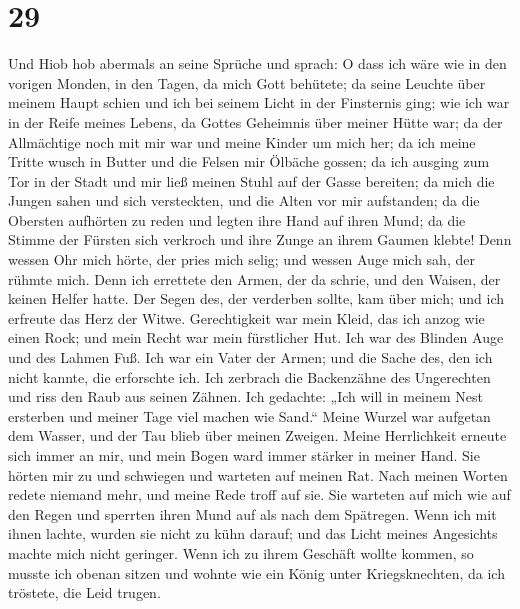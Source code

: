 \hypertarget{section-28}{%
\section{29}\label{section-28}}

 Und Hiob hob abermals an seine Sprüche und sprach:
 O dass ich wäre wie in den vorigen Monden, in den Tagen,
da mich Gott behütete;  da seine Leuchte über meinem Haupt
schien und ich bei seinem Licht in der Finsternis ging; 
wie ich war in der Reife meines Lebens, da Gottes Geheimnis über meiner
Hütte war;  da der Allmächtige noch mit mir war und meine
Kinder um mich her;  da ich meine Tritte wusch in Butter
und die Felsen mir Ölbäche gossen;  da ich ausging zum Tor
in der Stadt und mir ließ meinen Stuhl auf der Gasse bereiten;
 da mich die Jungen sahen und sich versteckten, und die
Alten vor mir aufstanden;  da die Obersten aufhörten zu
reden und legten ihre Hand auf ihren Mund;  da die Stimme
der Fürsten sich verkroch und ihre Zunge an ihrem Gaumen klebte!
 Denn wessen Ohr mich hörte, der pries mich selig; und
wessen Auge mich sah, der rühmte mich.  Denn ich
errettete den Armen, der da schrie, und den Waisen, der keinen Helfer
hatte.  Der Segen des, der verderben sollte, kam über
mich; und ich erfreute das Herz der Witwe.  Gerechtigkeit
war mein Kleid, das ich anzog wie einen Rock; und mein Recht war mein
fürstlicher Hut.  Ich war des Blinden Auge und des Lahmen
Fuß.  Ich war ein Vater der Armen; und die Sache des, den
ich nicht kannte, die erforschte ich.  Ich zerbrach die
Backenzähne des Ungerechten und riss den Raub aus seinen Zähnen.
 Ich gedachte: „Ich will in meinem Nest ersterben und
meiner Tage viel machen wie Sand.``  Meine Wurzel war
aufgetan dem Wasser, und der Tau blieb über meinen Zweigen.
 Meine Herrlichkeit erneute sich immer an mir, und mein
Bogen ward immer stärker in meiner Hand.  Sie hörten mir
zu und schwiegen und warteten auf meinen Rat.  Nach
meinen Worten redete niemand mehr, und meine Rede troff auf sie.
 Sie warteten auf mich wie auf den Regen und sperrten
ihren Mund auf als nach dem Spätregen.  Wenn ich mit
ihnen lachte, wurden sie nicht zu kühn darauf; und das Licht meines
Angesichts machte mich nicht geringer.  Wenn ich zu ihrem
Geschäft wollte kommen, so musste ich obenan sitzen und wohnte wie ein
König unter Kriegsknechten, da ich tröstete, die Leid trugen.

